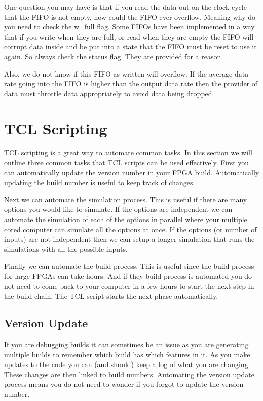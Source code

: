 One question you may have is that if you read the data out on the clock cycle that the \ac{FIFO} is not empty, how could the \ac{FIFO} ever overflow. Meaning why do you need to check the w\_full flag. Some \ac{FIFO}s have been implemented in a way that if you write when they are full, or read when they are empty the \ac{FIFO} will corrupt data inside and be put into a state that the \ac{FIFO} must be reset to use it again. So always check the status flag. They are provided for a reason.

Also, we do not know if this \ac{FIFO} as written will overflow. If the average data rate going into the \ac{FIFO} is higher than the output data rate then the provider of data must throttle data appropriately to avoid data being dropped. 

	
\section{TCL Scripting}

\ac{TCL} scripting is a great way to automate common tasks. In this section we will outline three common tasks that \ac{TCL} scripts can be used effectively. First you can automatically update the version number in your \ac{FPGA} build. Automatically updating the build number is useful to keep track of changes. 

Next we can automate the simulation process. This is useful if there are many options you would like to simulate. If the options are independent we can automate the simulation of each of the options in parallel where your multiple cored computer can simulate all the options at once. If the options (or number of inputs) are not independent then we can setup a longer simulation that runs the simulations with all the possible inputs.

Finally we can automate the build process. This is useful since the build process for large \ac{FPGA}s can take hours. And if they build process is automated you do not need to come back to your computer in a few hours to start the next step in the build chain. The \ac{TCL} script starts the next phase automatically.

\subsection{Version Update}

If you are debugging builds it can sometimes be an issue as you are generating multiple builds to remember which build has which features in it. As you make updates to the code you can (and should) keep a log of what you are changing. These changes are then linked to build numbers. Automating the version update process means you do not need to wonder if you forgot to update the version number.
	
